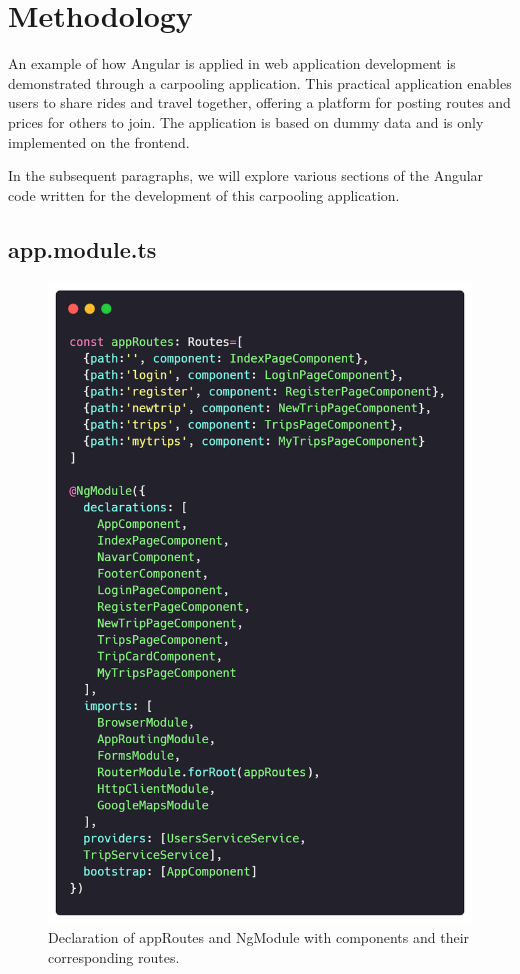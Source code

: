 \documentclass{article}
\begin{document}
\section{Methodology}  \label{sec:methodology}

An example of how Angular is applied in web application development is demonstrated through a carpooling application. This practical application enables users to share rides and travel together, offering a platform for posting routes and prices for others to join. The application is based on dummy data and is only implemented on the frontend.

In the subsequent paragraphs, we will explore various sections of the Angular code written for the development of this carpooling application.

\subsection*{app.module.ts}

\begin{figure}[h]
  \centering
  \includegraphics[width=0.9\columnwidth]{figures/app.module.ts.png}
  \caption{Declaration of appRoutes and NgModule with components and their corresponding routes.\label{fig:app.module.ts}}
  \end{figure}
\end{document}
